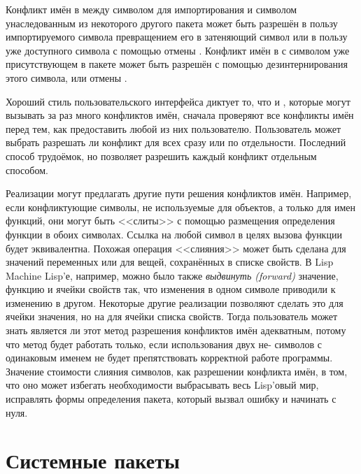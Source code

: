 Конфликт имён в  между символом для импортирования и символом
унаследованным из некоторого другого пакета может быть разрешён в пользу
импортируемого символа превращением его в затеняющий символ или в пользу уже
доступного символа с помощью отмены . Конфликт имён в  с
символом уже присутствующем в пакете может быть разрешён с помощью
дезинтернирования этого символа, или отмены .

Хороший стиль пользовательского интерфейса диктует то, что  и
, которые могут вызывать за раз много конфликтов имён, сначала
проверяют все конфликты имён перед тем, как предоставить любой из них
пользователю.
Пользователь может выбрать разрешать ли конфликт для всех сразу или по
отдельности. Последний способ трудоёмок, но позволяет разрешить каждый конфликт
отдельным способом.

Реализации могут предлагать другие пути решения конфликтов имён.
Например, если конфликтующие символы, не используемые для объектов, а только для
имен функций, они могут быть <<слиты>> с помощью размещения определения функции
в обоих символах. Ссылка на любой символ в целях вызова функции будет
эквивалентна. Похожая операция <<слияния>> может быть сделана для значений
переменных или для вещей, сохранённых в списке свойств. В Lisp Machine Lisp'е,
например, можно было также \emph{выдвинуть (forward)} значение, функцию и ячейки
свойств так, что изменения в одном символе приводили к изменению в
другом. Некоторые другие реализации позволяют сделать это для ячейки значения,
но на для ячейки списка свойств. Тогда пользователь может знать является ли этот
метод разрешения конфликтов имён адекватным, потому что метод будет работать
только, если использования двух не- символов с одинаковым именем не
будет препятствовать корректной работе программы. Значение стоимости слияния
символов, как разрешении конфликта имён, в том, что оно может избегать
необходимости выбрасывать весь Lisp'овый мир, исправлять формы определения
пакета, который вызвал ошибку и начинать с нуля.

\section{Системные пакеты}

